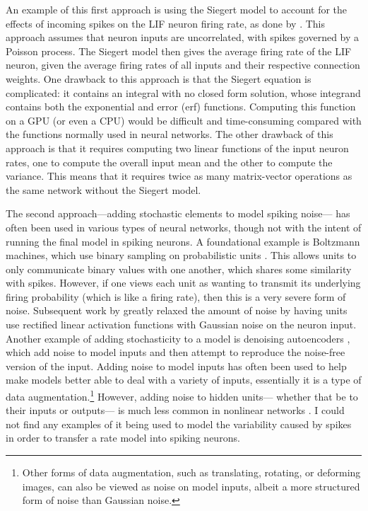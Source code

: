 An example of this first approach is using the Siegert model
to account for the effects of incoming spikes on the LIF neuron firing rate,
as done by \textcite{OConnor2013}.
This approach assumes that neuron inputs are uncorrelated,
with spikes governed by a Poisson process.
The Siegert model then gives the average firing rate of the LIF neuron,
given the average firing rates of all inputs and their respective connection weights.
One drawback to this approach is that the Siegert equation is complicated:
it contains an integral with no closed form solution,
whose integrand contains both the exponential and error (\textrm{erf}) functions.
Computing this function on a GPU (or even a CPU) would be difficult and time-consuming
compared with the functions normally used in neural networks.
The other drawback of this approach is that it requires computing
two linear functions of the input neuron rates,
one to compute the overall input mean and the other to compute the variance.
This means that it requires twice as many matrix-vector operations
as the same network without the Siegert model.

The second approach---adding stochastic elements to model spiking noise---%
has often been used in various types of neural networks,
though not with the intent of running the final model in spiking neurons.
A foundational example is Boltzmann machines,
which use binary sampling on probabilistic units \parencite{Hinton1983}.
This allows units to only communicate binary values with one another,
which shares some similarity with spikes.
However, if one views each unit as wanting to transmit
its underlying firing probability (which is like a firing rate),
then this is a very severe form of noise.
Subsequent work by \parencite{Nair2010} greatly relaxed the amount of noise
by having units use rectified linear activation functions
with Gaussian noise on the neuron input.
Another example of adding stochasticity to a model
is denoising autoencoders \parencite{Vincent2008},
which add noise to model inputs and then attempt
to reproduce the noise-free version of the input.
Adding noise to model inputs has often been used
to help make models better able to deal with a variety of inputs,
essentially it is a type of data augmentation.\footnote{
  Other forms of data augmentation,
  such as translating, rotating, or deforming images,
  can also be viewed as noise on model inputs,
  albeit a more structured form of noise than Gaussian noise.}
However, adding noise to hidden units---%
whether that be to their inputs or outputs---%
is much less common in nonlinear networks \parencite{Poole2014}.
I could not find any examples of it being used
to model the variability caused by spikes
in order to transfer a rate model into spiking neurons.

